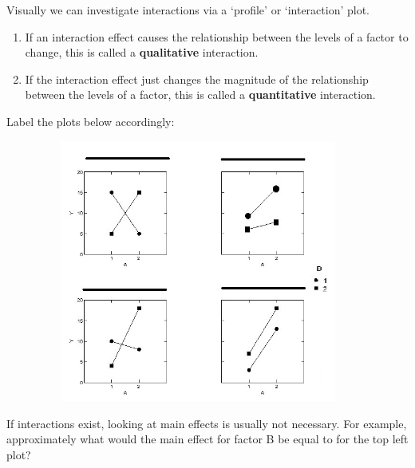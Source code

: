 Visually we can investigate interactions via a `profile' or `interaction' plot.
\begin{enumerate}
\item If an interaction effect causes the relationship between the levels of a factor to change, this is called a \textbf{qualitative} interaction.  
\item If the interaction effect just changes the magnitude of the relationship between the levels of a factor, this is called a \textbf{quantitative} interaction.
\end{enumerate}
Label the plots below accordingly:
\begin{center}
\includegraphics[height=3.4in,width=5in]{interact}
\end{center}
If interactions exist, looking at main effects is usually not necessary.  For example, approximately what would the main effect for factor B be equal to for the top left plot? \\~\\~\\~\\~\\

